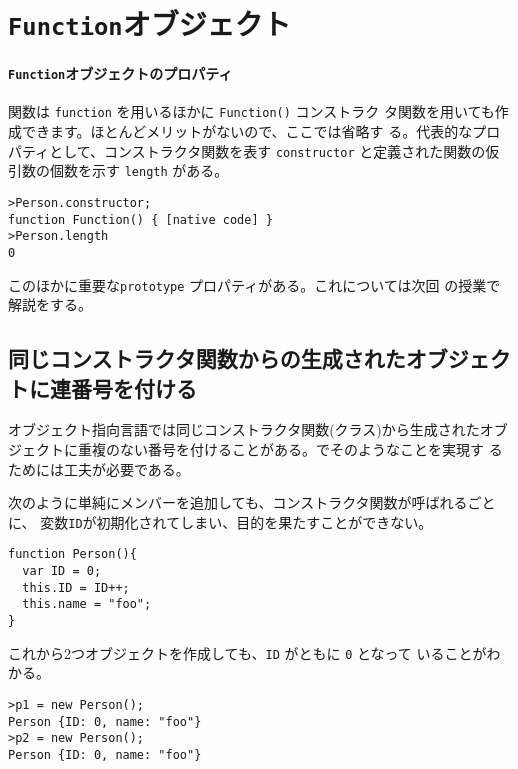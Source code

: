 \section{\protect\texttt{Function}オブジェクト}
\paragraph{\protect\texttt{Function}オブジェクトのプロパティ}
関数は \texttt{function} を用いるほかに \texttt{Function()} コンストラク
タ関数を用いても作成できます。ほとんどメリットがないので、ここでは省略す
る。代表的なプロパティとして、コンストラクタ関数を表す
\texttt{constructor} と定義された関数の仮引数の個数を示す
\texttt{length} がある。
\begin{Verbatim}
>Person.constructor;
function Function() { [native code] }
>Person.length
0
\end{Verbatim}
このほかに重要な\texttt{prototype} プロパティがある。これについては次回
の授業で解説をする。
\fi
\iffalse
\subsection{同じコンストラクタ関数からの生成されたオブジェクトに連番号を付ける}\label{SetID}
オブジェクト指向言語では同じコンストラクタ関数(クラス)から生成されたオブ
ジェクトに重複のない番号を付けることがある。\JS でそのようなことを実現す
るためには工夫が必要である。

次のように単純にメンバーを追加しても、コンストラクタ関数が呼ばれるごとに、
変数\texttt{ID}が初期化されてしまい、目的を果たすことができない。
\begin{Verbatim}
function Person(){
  var ID = 0;
  this.ID = ID++;
  this.name = "foo";
}
\end{Verbatim}
これから2つオブジェクトを作成しても、\texttt{ID} がともに \texttt{0} となって
いることがわかる。
\begin{Verbatim}
>p1 = new Person();
Person {ID: 0, name: "foo"}
>p2 = new Person();
Person {ID: 0, name: "foo"}
\end{Verbatim}

